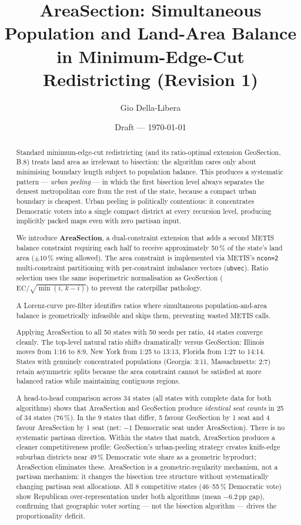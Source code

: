 \documentclass[12pt]{article}
\title{AreaSection: Simultaneous Population and Land-Area Balance\\
       in Minimum-Edge-Cut Redistricting (Revision 1)}
\author{Gio Della-Libera}
\date{Draft --- \today}
\begin{document}
\maketitle

\begin{abstract}
Standard minimum-edge-cut redistricting (and its ratio-optimal extension
GeoSection, B.8) treats land area as irrelevant to bisection: the algorithm
cares only about minimising boundary length subject to population balance.
This produces a systematic pattern --- \emph{urban peeling} --- in which the
first bisection level always separates the densest metropolitan core from the
rest of the state, because a compact urban boundary is cheapest.
Urban peeling is politically contentious: it concentrates Democratic voters
into a single compact district at every recursion level, producing implicitly
packed maps even with zero partisan input.

We introduce \textbf{AreaSection}, a dual-constraint extension that adds a
second METIS balance constraint requiring each half to receive approximately
50\,\% of the state's land area ($\pm 10$\,\% swing allowed).
The area constraint is implemented via METIS's \texttt{ncon=2} multi-constraint
partitioning with per-constraint imbalance vectors (\texttt{ubvec}).
Ratio selection uses the same isoperimetric normalisation as GeoSection
($\mathrm{EC}/\sqrt{\min(i,\,k-i)}$) to prevent the caterpillar pathology.

A Lorenz-curve pre-filter identifies ratios where simultaneous
population-and-area balance is geometrically infeasible and skips them,
preventing wasted METIS calls.

Applying AreaSection to all 50 states with 50 seeds per ratio,
44 states converge cleanly.
The top-level natural ratio shifts dramatically versus GeoSection:
Illinois moves from 1:16 to 8:9, New York from 1:25 to 13:13, Florida from
1:27 to 14:14.
States with genuinely concentrated populations (Georgia: 3:11, Massachusetts: 2:7)
retain asymmetric splits because the area constraint cannot be satisfied at
more balanced ratios while maintaining contiguous regions.

A head-to-head comparison across 34 states (all states with complete data
for both algorithms) shows that AreaSection and GeoSection produce
\emph{identical seat counts} in 25 of 34 states (76\,\%).
In the 9 states that differ, 5 favour GeoSection by 1 seat and 4 favour
AreaSection by 1 seat (net: $-1$ Democratic seat under AreaSection).
There is no systematic partisan direction.
Within the states that match, AreaSection produces a cleaner competitiveness
profile: GeoSection's urban-peeling strategy creates knife-edge suburban
districts near 49\,\% Democratic vote share as a geometric byproduct;
AreaSection eliminates these.
AreaSection is a geometric-regularity mechanism, not a partisan mechanism:
it changes the bisection tree structure without systematically changing partisan seat allocations.
All 8 competitive states (46--55\,\% Democratic vote) show Republican
over-representation under both algorithms (mean $-6.2$\,pp gap), confirming
that geographic voter sorting — not the bisection algorithm — drives the
proportionality deficit.
\end{abstract}










\end{document}
